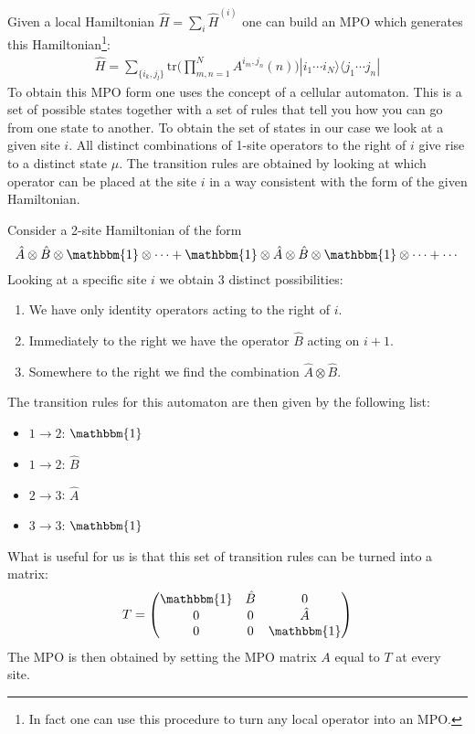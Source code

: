     \begin{method}
        Given a local Hamiltonian $\hat{H}=\sum_i\hat{H}^{(i)}$ one can build an MPO which generates this Hamiltonian\footnote{In fact one can use this procedure to turn any local operator into an MPO.}:
        \begin{gather}
            \hat{H} = \sum_{\{i_k,j_l\}}\text{tr}\Big(\prod_{m,n=1}^NA^{i_m,j_n}(n)\Big)|i_1\cdots i_N\rangle\langle j_1\cdots j_n|
        \end{gather}
        To obtain this MPO form one uses the concept of a cellular automaton. This is a set of possible states together with a set of rules that tell you how you can go from one state to another. To obtain the set of states in our case we look at a given site $i$. All distinct combinations of 1-site operators to the right of $i$ give rise to a distinct state $\mu$. The transition rules are obtained by looking at which operator can be placed at the site $i$ in a way consistent with the form of the given Hamiltonian.
    \end{method}
    \begin{example}
        Consider a 2-site Hamiltonian of the form \[\hat{A}\otimes\hat{B}\otimes\mathbbm{1}\otimes\cdots+\mathbbm{1}\otimes\hat{A}\otimes\hat{B}\otimes\mathbbm{1}\otimes\cdots+\cdots\] Looking at a specific site $i$ we obtain 3 distinct possibilities:
        \begin{enumerate}
            \item We have only identity operators acting to the right of $i$.
            \item Immediately to the right we have the operator $\hat{B}$ acting on $i+1$.
            \item Somewhere to the right we find the combination $\hat{A}\otimes\hat{B}$.
        \end{enumerate}
        The transition rules for this automaton are then given by the following list:
        \begin{itemize}
            \item $1\rightarrow2$: $\mathbbm{1}$
            \item $1\rightarrow2$: $\hat{B}$
            \item $2\rightarrow3$: $\hat{A}$
            \item $3\rightarrow3$: $\mathbbm{1}$
        \end{itemize}
        What is useful for us is that this set of transition rules can be turned into a matrix: \[T=\begin{pmatrix}\mathbbm{1}&\hat{B}&0\\0&0&\hat{A}\\0&0&\mathbbm{1}\end{pmatrix}\] The MPO is then obtained by setting the MPO matrix $A$ equal to $T$ at every site.
    \end{example}

